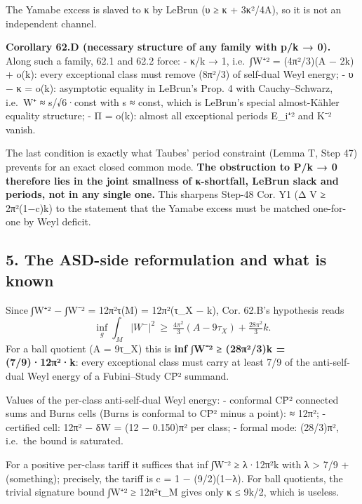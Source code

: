 \documentclass[
  10pt,
]{report}
\begin{document}
The Yamabe excess is slaved to κ by LeBrun (υ ≥ κ + 3κ²/4A), so it is
not an independent channel.

\textbf{Corollary 62.D (necessary structure of any family with p/k →
0).} Along such a family, 62.1 and 62.2 force: - κ/k → 1,
i.e.~∫\textbar W⁺\textbar² = (4π²/3)(A − 2k) + o(k): every exceptional
class must remove (8π²/3) of self-dual Weyl energy; - υ − κ = o(k):
asymptotic equality in LeBrun's Prop. 4 with Cauchy--Schwarz,
i.e.~\textbar W⁺\textbar{} ≈ \textbar s\textbar/√6·const with s ≈ const,
which is LeBrun's special almost-Kähler equality structure; - Π = o(k):
almost all exceptional periods \textbar E\_i⁺\textbar² and
\textbar K⁻\textbar² vanish.

The last condition is exactly what Taubes' period constraint (Lemma T,
Step 47) prevents for an exact closed common mode. \textbf{The
obstruction to P/k → 0 therefore lies in the joint smallness of
κ-shortfall, LeBrun slack and periods, not in any single one.} This
sharpens Step-48 Cor. Y1 (Δ V ≥ 2π²(1−c)k) to the statement that the
Yamabe excess must be matched one-for-one by Weyl deficit.

\hypertarget{the-asd-side-reformulation-and-what-is-known}{%
\subsection{5. The ASD-side reformulation and what is
known}\label{the-asd-side-reformulation-and-what-is-known}}

Since ∫\textbar W⁺\textbar² − ∫\textbar W⁻\textbar² = 12π²τ(M) =
12π²(τ\_X − k), Cor. 62.B's hypothesis reads \[
\inf_g\int_M|W^-|^2\ \ge\ \tfrac{4\pi^2}{3}(A-9\tau_X)+\tfrac{28\pi^2}{3}k .
\] For a ball quotient (A = 9τ\_X) this is \textbf{inf
∫\textbar W⁻\textbar² ≥ (28π²/3)k = (7/9)·12π²·k}: every exceptional
class must carry at least 7/9 of the anti-self-dual Weyl energy of a
Fubini--Study CP̄² summand.

Values of the per-class anti-self-dual Weyl energy: - conformal CP̄²
connected sums and Burns cells (Burns is conformal to CP̄² minus a
point): ≈ 12π²; - certified cell: 12π² − δW = (12 − 0.150)π² per class;
- formal mode: (28/3)π², i.e.~the bound is saturated.

For a positive per-class tariff it suffices that inf
∫\textbar W⁻\textbar² ≥ λ·12π²k with λ \textgreater{} 7/9 + (something);
precisely, the tariff is c = 1 − (9/2)(1−λ). For ball quotients, the
trivial signature bound ∫\textbar W⁺\textbar² ≥ 12π²τ\_M gives only κ ≤
9k/2, which is useless.
\end{document}
